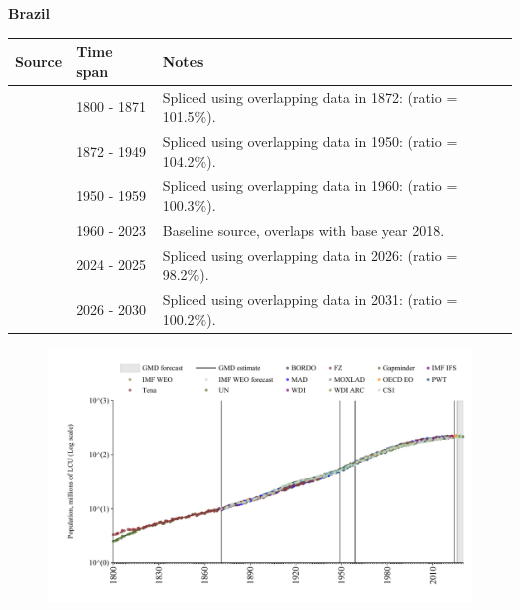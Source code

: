 \documentclass[12pt,a4paper,landscape]{article}
\begin{document}
\begin{adjustbox}{max totalsize={\paperwidth}{\paperheight},center}
\begin{minipage}[t][\textheight][t]{\textwidth}
\vspace*{0.5cm}
{}
\begin{center}
{\Large\bfseries Brazil}
\end{center}
\vspace{0.5cm}
\begin{table}[H]
\centering
\small
\begin{tabular}{|l|l|l|}
\hline
\textbf{Source} & \textbf{Time span} & \textbf{Notes} \\
\hline
\rowcolor{white}\cite{Gapminder}& 1800 - 1871 &Spliced using overlapping data in 1872: (ratio = 101.5\%).\\
\rowcolor{lightgray}\cite{CS1_BRA}& 1872 - 1949 &Spliced using overlapping data in 1950: (ratio = 104.2\%).\\
\rowcolor{white}\cite{IMF_IFS}& 1950 - 1959 &Spliced using overlapping data in 1960: (ratio = 100.3\%).\\
\rowcolor{lightgray}\cite{WDI}& 1960 - 2023 &Baseline source, overlaps with base year 2018.\\
\rowcolor{white}\cite{OECD_EO}& 2024 - 2025 &Spliced using overlapping data in 2026: (ratio = 98.2\%).\\
\rowcolor{lightgray}\cite{Gapminder}& 2026 - 2030 &Spliced using overlapping data in 2031: (ratio = 100.2\%).\\
\hline
\end{tabular}
\end{table}
\begin{figure}[H]
\centering
\includegraphics[width=\textwidth,height=0.6\textheight,keepaspectratio]{graphs/BRA_pop.pdf}
\end{figure}
\end{minipage}
\end{adjustbox}
\end{document}

